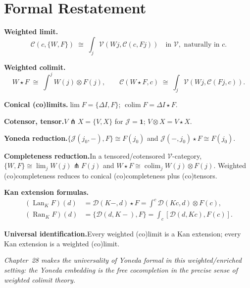\section*{Formal Restatement}

\begin{formalrestatement}
\textbf{Weighted limit.}\quad
\begin{equation*}
  \mathcal{C}(c, \{W, F\}) \;\cong\; \int_j \mathcal{V}(W j, \mathcal{C}(c, F j))
  \quad\text{in } \mathcal{V}, \text{ naturally in } c.
\end{equation*}

\medskip
\textbf{Weighted colimit.}\quad
\begin{equation*}
  W \star F \;\cong\; \int^j W(j) \otimes F(j),
  \qquad
  \mathcal{C}(W \star F, c) \;\cong\; \int_j \mathcal{V}(W j, \mathcal{C}(F j, c)).
\end{equation*}

\medskip
\textbf{Conical (co)limits.}\quad $\lim F = \{\Delta I, F\}$; $\operatorname{colim} F
= \Delta I \star F$.

\medskip
\textbf{Cotensor, tensor.}\quad $V \pitchfork X = \{V, X\}$ for $\mathcal{J} =
\mathbf{1}$; $V \otimes X = V \star X$.

\medskip
\textbf{Yoneda reduction.}\quad $\{\mathcal{J}(j_0, -), F\} \cong F(j_0)$ and
$\mathcal{J}(-, j_0) \star F \cong F(j_0)$.

\medskip
\textbf{Completeness reduction.}\quad In a tensored/cotensored $\mathcal{V}$-category,
$\{W, F\} \cong \lim_j W(j) \pitchfork F(j)$ and $W \star F \cong \operatorname{colim}_j
W(j) \otimes F(j)$. Weighted (co)completeness reduces to conical (co)completeness
plus (co)tensors.

\medskip
\textbf{Kan extension formulas.}\quad
\begin{align*}
  (\operatorname{Lan}_K F)(d) &= \mathcal{D}(K-, d) \star F = \int^c \mathcal{D}(K c, d) \otimes F(c), \\
  (\operatorname{Ran}_K F)(d) &= \{\mathcal{D}(d, K-), F\} = \int_c [\mathcal{D}(d, K c), F(c)].
\end{align*}

\medskip
\textbf{Universal identification.}\quad Every weighted (co)limit is a Kan
extension; every Kan extension is a weighted (co)limit.

\medskip
\noindent\textit{Chapter~28 makes the universality of Yoneda formal in this
weighted/enriched setting: \emph{the Yoneda embedding is the free cocompletion}
in the precise sense of weighted colimit theory.}
\end{formalrestatement}
